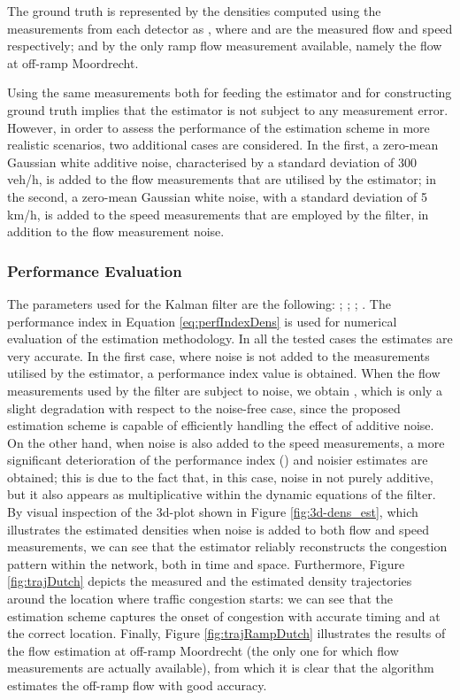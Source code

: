\documentclass[titlepage,oneside,fleqn,12pt]{article}
\begin{document}
The ground truth is represented by the densities computed using the measurements from each detector as , where  and  are the measured flow and speed respectively; and by the only ramp flow measurement available, namely the flow at off-ramp Moordrecht.

Using the same measurements both for feeding the estimator and for constructing ground truth implies that the estimator is not subject to any measurement error. However, in order to assess the performance of the estimation scheme in more realistic scenarios, two additional cases are considered. In the first, a zero-mean Gaussian white additive noise, characterised by a standard deviation of 300\,veh/h, is added to the flow measurements that are utilised by the estimator; in the second, a zero-mean Gaussian white noise, with a standard deviation of 5\,km/h, is added to the speed measurements that are employed by the filter, in addition to the flow measurement noise.

\subsubsection{Performance Evaluation}

The parameters used for the Kalman filter are the following: ;  ; ; .
The performance index in Equation \ref{eq:perfIndexDens} is used for numerical evaluation of the estimation methodology. In all the tested cases the estimates are very accurate. In the first case, where noise is not added to the measurements utilised by the estimator, a performance index value  is obtained. When the flow measurements used by the filter are subject to noise, we obtain , which is only a slight degradation with respect to the noise-free case, since the proposed estimation scheme is capable of efficiently handling the effect of additive noise. On the other hand, when noise is also added to the speed measurements, a more significant deterioration of the performance index () and noisier estimates are obtained; this is due to the fact that, in this case, noise in not purely additive, but it also appears as multiplicative within the dynamic equations of the filter. By visual inspection of the 3d-plot shown in Figure \ref{fig:3d-dens_est}, which illustrates the estimated densities when noise is added to both flow and speed measurements, we can see that the estimator reliably reconstructs the congestion pattern within the network, both in time and space. Furthermore, Figure \ref{fig:trajDutch} depicts the measured and the estimated density trajectories around the location where traffic congestion starts: we can see that the estimation scheme captures the onset of congestion with accurate timing and at the correct location. Finally, Figure \ref{fig:trajRampDutch} illustrates the results of the flow estimation at off-ramp Moordrecht (the only one for which flow measurements are actually available), from which it is clear that the algorithm estimates the off-ramp flow with good accuracy.
\end{document}
